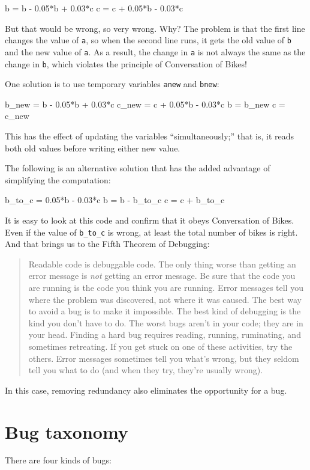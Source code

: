 \documentclass[
]{book}
\numberwithin{Answer}{chapter}
\numberwithin{Exercise}{chapter}
\newcommand{\displaythrm}[1]{%
    \ifthenelse{\equal{#1}{1}}%
        {Readable code is debuggable code.}{%
    \ifthenelse{\equal{#1}{2}}%
        {The only thing worse than getting an error message is {\em
         not} getting an error message.}{%
    \ifthenelse{\equal{#1}{3}}%
        {Be sure that the code you are running
         is the code you think you are running.}{%
    \ifthenelse{\equal{#1}{4}}%
        {Error messages tell you where the problem was discovered,
         not where it was caused.}{%
    \ifthenelse{\equal{#1}{5}}%
        {The best way to avoid a bug is to make it impossible.}{%
    \ifthenelse{\equal{#1}{6}}%
        {The best kind of debugging is the kind you don't have to do.}{%
    \ifthenelse{\equal{#1}{7}}%
        {The worst bugs aren't in your code; they are in your head.}{%
    \ifthenelse{\equal{#1}{8}}%
        {Finding a hard bug requires reading, running, ruminating,
         and sometimes retreating.  If you get stuck on one of these
         activities, try the others.}{%
    \ifthenelse{\equal{#1}{9}}%
        {Error messages sometimes tell you what's wrong, but they
         seldom tell you what to do (and when they try, they're usually
         wrong).}{%
    {}%
}}}}}}}}}}%
\begin{document}

\begin{code}
b = b - 0.05*b + 0.03*c
c = c + 0.05*b - 0.03*c
\end{code}

But that would be wrong, so very wrong.  Why?  The problem is that
the first line changes the value of {\tt a}, so when the second line
runs, it gets the old value of {\tt b} and the new value of {\tt a}.
As a result, the change in {\tt a} is not always the same as the
change in {\tt b}, which violates the principle of Conversation
of Bikes!

One solution is to use temporary variables {\tt anew} and {\tt bnew}:

\begin{code}
b_new = b - 0.05*b + 0.03*c
c_new = c + 0.05*b - 0.03*c
b = b_new
c = c_new
\end{code}

This has the effect of updating the variables ``simultaneously;'' that
is, it reads both old values before writing either new value.


The following is an alternative solution that
has the added advantage of simplifying the computation:

\begin{code}
b_to_c = 0.05*b - 0.03*c
b = b - b_to_c
c = c + b_to_c
\end{code}


It is easy to look at this code and confirm that it obeys Conversation
of Bikes.  Even if the value of \verb"b_to_c" is wrong, at least the total
number of bikes is right.  And that brings us to the Fifth Theorem of
Debugging:

\begin{quote}
\displaythrm{5}
\end{quote}

In this case, removing redundancy also eliminates the opportunity for
a bug.


\section{Bug taxonomy}

There are four kinds of bugs:

\end{document}

